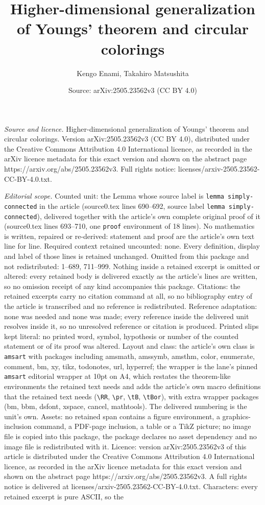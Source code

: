\documentclass[10pt,a4paper]{amsart}
\title[Higher-dimensional generalization of Youngs' theorem and cir]{Higher-dimensional generalization of Youngs' theorem and circular colorings}
\author{Kengo Enami, Takahiro Matsushita}
\date{Source: arXiv:2505.23562v3 (CC BY 4.0)}
\begin{document}
\maketitle

\noindent\emph{Source and licence.} Higher-dimensional generalization of Youngs' theorem and circular colorings. Version arXiv:2505.23562v3 (CC BY 4.0), distributed under the Creative Commons Attribution 4.0 International licence, as recorded in the arXiv licence metadata for this exact version and shown on the abstract page https://arxiv.org/abs/2505.23562v3. Full rights notice: licenses/arxiv-2505.23562-CC-BY-4.0.txt.\par\smallskip

\noindent\textit{Editorial scope.} Counted unit: the Lemma whose source label is \texttt{lemma simply-connected} in the article (source0.tex lines 690--692, source label \texttt{lemma simply-connected}), delivered together with the article's own complete original proof of it (source0.tex lines 693--710, one \texttt{proof} environment of 18 lines). No mathematics is written, repaired or re-derived: statement and proof are the article's own text line for line. Required context retained uncounted: none. Every definition, display and label of those lines is retained unchanged. Omitted from this package and not redistributed: 1--689, 711--999. Nothing inside a retained excerpt is omitted or altered: every retained body is delivered exactly as the article's lines are written, so no omission receipt of any kind accompanies this package. Citations: the retained excerpts carry no citation command at all, so no bibliography entry of the article is transcribed and no reference is redistributed. Reference adaptation: none was needed and none was made; every reference inside the delivered unit resolves inside it, so no unresolved reference or citation is produced. Printed slips kept literal: no printed word, symbol, hypothesis or number of the counted statement or of its proof was altered. Layout and class: the article's own class is \texttt{amsart} with packages including amsmath, amssymb, amsthm, color, enumerate, comment, bm, xy, tikz, todonotes, url, hyperref; the wrapper is the lane's pinned \texttt{amsart} editorial wrapper at 10pt on A4, which restates the theorem-like environments the retained text needs and adds the article's own macro definitions that the retained text needs (\texttt{\textbackslash RR}, \texttt{\textbackslash pr}, \texttt{\textbackslash tB}, \texttt{\textbackslash tBor}), with extra wrapper packages (bm, bbm, dsfont, xspace, cancel, mathtools). The delivered numbering is the unit's own. Assets: no retained span contains a figure environment, a graphics-inclusion command, a PDF-page inclusion, a table or a TikZ picture; no image file is copied into this package, the package declares no asset dependency and no image file is redistributed with it. Licence: version arXiv:2505.23562v3 of this article is distributed under the Creative Commons Attribution 4.0 International licence, as recorded in the arXiv licence metadata for this exact version and shown on the abstract page https://arxiv.org/abs/2505.23562v3. A full rights notice is delivered at licenses/arxiv-2505.23562-CC-BY-4.0.txt. Characters: every retained excerpt is pure ASCII, so the 
\end{document}
